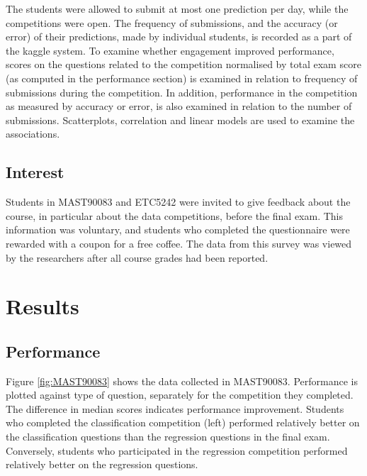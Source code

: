 \documentclass[12pt]{article}
\begin{document}
The students were allowed to submit at most one prediction per day,
while the competitions were open. The frequency of submissions, and the
accuracy (or error) of their predictions, made by individual students,
is recorded as a part of the kaggle system. To examine whether
engagement improved performance, scores on the questions related to the
competition normalised by total exam score (as computed in the
performance section) is examined in relation to frequency of submissions
during the competition. In addition, performance in the competition as
measured by accuracy or error, is also examined in relation to the
number of submissions. Scatterplots, correlation and linear models are
used to examine the associations.

\subsection{Interest}\label{interest}

Students in MAST90083 and ETC5242 were invited to give feedback about
the course, in particular about the data competitions, before the final
exam. This information was voluntary, and students who completed the
questionnaire were rewarded with a coupon for a free coffee. The data
from this survey was viewed by the researchers after all course grades
had been reported.

\section{Results}\label{results}

\subsection{Performance}\label{performance-1}

Figure \ref{fig:MAST90083} shows the data collected in MAST90083.
Performance is plotted against type of question, separately for the
competition they completed. The difference in median scores indicates
performance improvement. Students who completed the classification
competition (left) performed relatively better on the classification
questions than the regression questions in the final exam. Conversely,
students who participated in the regression competition performed
relatively better on the regression questions.
\end{document}
